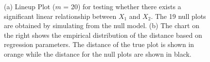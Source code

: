 \documentclass[12]{article}
\begin{document}
\begin{figure}[hbtp]
\centering
{}
\label{dist}
	\vspace{-.1in}
\caption[Optional caption for list of figures]{(a) Lineup Plot ($m$ = 20) for testing whether there exists a significant linear relationship between $X_1$ and $X_2$. The 19 null plots are obtained by simulating from the null model.  (b) The chart on the right shows the empirical distribution of the distance based on regression parameters. The distance of the true plot is shown in orange while the distance for the null plots are shown in black. }
\end{figure}
\end{document}
